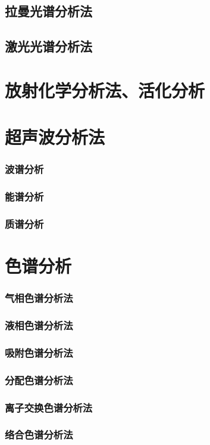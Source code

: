 \documentclass[UTF8]{../03-Chemistry}
\begin{document}
    \subsection{拉曼光谱分析法}
    \subsection{激光光谱分析法}
\section{放射化学分析法、活化分析}
\section{超声波分析法}
    \subsubsection{波谱分析}
    \subsubsection{能谱分析}
    \subsubsection{质谱分析}
\section{色谱分析}
    \subsubsection{气相色谱分析法}
    \subsubsection{液相色谱分析法}
    \subsubsection{吸附色谱分析法}
    \subsubsection{分配色谱分析法}
    \subsubsection{离子交换色谱分析法}
    \subsubsection{络合色谱分析法}
\end{document}
